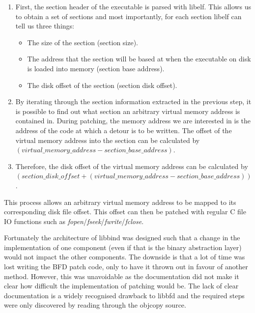 \begin{enumerate}
\item First, the section header of the executable is parsed with libelf. This allows us to obtain a set of sections and most importantly, for each section libelf can tell us three things:
  \begin{itemize}
  \item The size of the section (section size).
  \item The address that the section will be based at when the executable on disk is loaded into memory (section base address).
  \item The disk offset of the section (section disk offset).
  \end{itemize}
\item By iterating through the section information extracted in the previous step, it is possible to find out what section an arbitrary virtual memory address is contained in. During patching, the memory address we are interested in is the address of the code at which a detour is to be written. The offset of the virtual memory address into the section can be calculated by $(virtual\_memory\_address - section\_base\_address)$. 
\item Therefore, the disk offset of the virtual memory address can be calculated by $( section\_disk\_offset + (virtual\_memory\_address - section\_base\_address))$.
\end{enumerate}

This process allows an arbitrary virtual memory address to be mapped to its corresponding disk file offset. This offset can then be patched with regular C file IO functions such as \emph{fopen}/\emph{fseek}/\emph{fwrite}/\emph{fclose}.

Fortunately the architecture of libbind was designed such that a change in the implementation of one component (even if that is the binary abstraction layer) would not impact the other components. The downside is that a lot of time was lost writing the BFD patch code, only to have it thrown out in favour of another method. However, this was unavoidable as the documentation did not make it clear how difficult the implementation of patching would be. The lack of clear documentation is a widely recognised drawback to libbfd and the required steps were only discovered by reading through the objcopy source.


